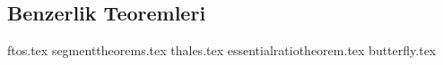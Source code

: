 \subsection{Benzerlik Teoremleri}

{ftos.tex}
\newpage
{segmenttheorems.tex}
\newpage
{thales.tex}
\newpage
{essentialratiotheorem.tex}
\newpage
{butterfly.tex}
\newpage